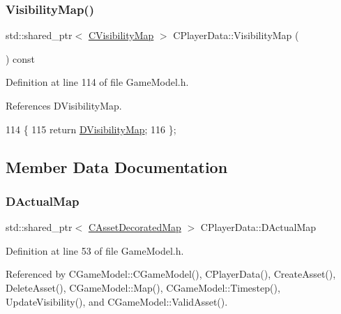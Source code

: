 \subsubsection{\texorpdfstring{Visibility\+Map()}{VisibilityMap()}}
{\footnotesize\ttfamily std\+::shared\+\_\+ptr$<$ \hyperlink{classCVisibilityMap}{C\+Visibility\+Map} $>$ C\+Player\+Data\+::\+Visibility\+Map (\begin{DoxyParamCaption}{ }\end{DoxyParamCaption}) const\hspace{0.3cm}{\ttfamily [inline]}}



Definition at line 114 of file Game\+Model.\+h.



References D\+Visibility\+Map.


\begin{DoxyCode}
114                                                              \{
115             \textcolor{keywordflow}{return} \hyperlink{classCPlayerData_a804ea65e7ec7c90b2e335414d106cc78}{DVisibilityMap};  
116         \};
\end{DoxyCode}


\subsection{Member Data Documentation}
\hypertarget{classCPlayerData_a943801106af1d7ad52abd73d32552186}{}\label{classCPlayerData_a943801106af1d7ad52abd73d32552186} 
\subsubsection{\texorpdfstring{D\+Actual\+Map}{DActualMap}}
{\footnotesize\ttfamily std\+::shared\+\_\+ptr$<$ \hyperlink{classCAssetDecoratedMap}{C\+Asset\+Decorated\+Map} $>$ C\+Player\+Data\+::\+D\+Actual\+Map\hspace{0.3cm}{\ttfamily [protected]}}



Definition at line 53 of file Game\+Model.\+h.



Referenced by C\+Game\+Model\+::\+C\+Game\+Model(), C\+Player\+Data(), Create\+Asset(), Delete\+Asset(), C\+Game\+Model\+::\+Map(), C\+Game\+Model\+::\+Timestep(), Update\+Visibility(), and C\+Game\+Model\+::\+Valid\+Asset().


